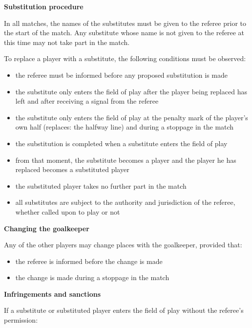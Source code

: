 \bigskip

{\bfseries Substitution procedure}

\headlinebox

In all matches, the names of the substitutes must be given to the referee prior to the start of the match. Any substitute whose name is not given to the referee at this time may not take part in the match.

\bigskip

To replace a player with a substitute, the following conditions must be observed:

\begin{itemize}
\item the referee must be informed before any proposed substitution is made
\item the substitute only enters the field of play after the player being replaced has left and after receiving a signal from the referee
\item the substitute only enters the field of play at the penalty mark of the player's own half {\color[rgb]{0.4,0.4,0.4}
(replaces: the halfway line)} and during a stoppage in the match 
\item the substitution is completed when a substitute enters the field of play
\item from that moment, the substitute becomes a player and the player he has replaced becomes a substituted player 
\item the substituted player takes no further part in the match
\item all substitutes are subject to the authority and jurisdiction of the referee, whether called upon to play or not
\end{itemize}

{\bfseries Changing the goalkeeper}

\headlinebox

Any of the other players may change places with the goalkeeper, provided that:

\begin{itemize}
\item the referee is informed before the change is made
\item the change is made during a stoppage in the match
\end{itemize}

{\bfseries Infringements and sanctions}

\headlinebox

If a substitute or substituted player enters the field of play without the referee's permission:

